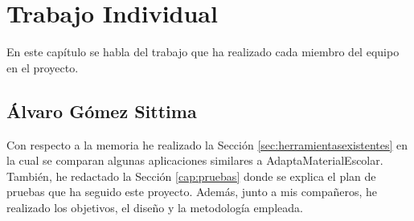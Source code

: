 \chapter{Trabajo Individual}
\label{cap:TrabajoIndividual}

En este capítulo se habla del trabajo que ha realizado cada miembro del equipo en el proyecto.

\section{Álvaro Gómez Sittima}
Con respecto a la memoria he realizado la Sección \ref{sec:herramientasexistentes} en la cual se comparan algunas aplicaciones similares a AdaptaMaterialEscolar. También, he redactado la Sección \ref{cap:pruebas} donde se explica el plan de pruebas que ha seguido este proyecto. Además, junto a mis compañeros, he realizado los objetivos, el diseño y la metodología empleada.
